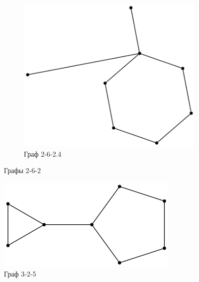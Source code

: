 \begin{solution}
\begin{figure}[H]
\begin{subfigure}[b]{0.45\linewidth}
    \end{subfigure}
    \begin{subfigure}[b]{0.45\linewidth} 
        \centering
        \includegraphics[scale=0.4]{Fall/img/solution-441_262_4.dot.png}
        \caption{Граф 2-6-2.4} \label{graph 2-6-2.4}
    \end{subfigure}
    
    \caption{Графы 2-6-2} \label{group 2-6-2}
\end{figure}

\begin{figure}[H]
    \centering
    \includegraphics[scale=0.4]{Fall/img/solution-441_325_0.dot.png}
    \caption{Граф 3-2-5} \label{group 3-2-5}
\end{figure}


\end{solution}
